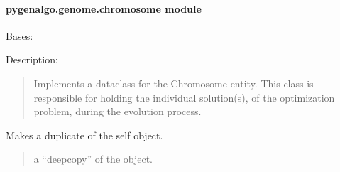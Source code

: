 \documentclass[letterpaper,10pt,english]{sphinxmanual}
\begin{document}
\paragraph{pygenalgo.genome.chromosome module}
\label{\detokenize{pygenalgo.genome:module-pygenalgo.genome.chromosome}}\label{\detokenize{pygenalgo.genome:pygenalgo-genome-chromosome-module}}

\begin{fulllineitems}
\label{\detokenize{pygenalgo.genome:pygenalgo.genome.chromosome.Chromosome}}
\pysigstartsignatures
\pysiglinewithargsret
{}
{\sphinxparamcomma {}\sphinxparamcomma {}}
{}
\pysigstopsignatures
\sphinxAtStartPar
Bases: 

\sphinxAtStartPar
Description:
\begin{quote}

\sphinxAtStartPar
Implements a dataclass for the Chromosome entity. This class is responsible
for holding the individual solution(s), of the optimization problem, during
the evolution process.
\end{quote}

\begin{fulllineitems}
\label{\detokenize{pygenalgo.genome:pygenalgo.genome.chromosome.Chromosome.clone}}
\pysigstartsignatures
\pysiglinewithargsret
{}
{}
{}
\pysigstopsignatures
\sphinxAtStartPar
Makes a duplicate of the self object.
\begin{quote}\begin{description}
\sphinxAtStartPar
a “deep\sphinxhyphen{}copy” of the object.

\end{description}\end{quote}


\end{fulllineitems}
\end{fulllineitems}
\end{document}
